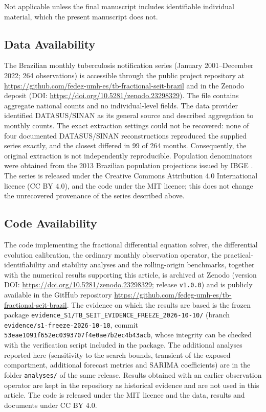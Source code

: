 \documentclass[pdflatex,sn-mathphys-ay,lineno]{sn-jnl}
\begin{document}
Not applicable unless the final manuscript includes identifiable individual material, which the present manuscript does not.

\subsection{Data Availability}

The Brazilian monthly tuberculosis notification series (January 2001--December 2022; 264 observations) is accessible through the public project repository at \url{https://github.com/fedeg-umh-es/tb-fractional-seit-brazil} and in the Zenodo deposit (DOI: \url{https://doi.org/10.5281/zenodo.23298329}). The file contains aggregate national counts and no individual-level fields. The data provider identified DATASUS/SINAN as its general source and described aggregation to monthly counts. The exact extraction settings could not be recovered: none of four documented DATASUS/SINAN reconstructions reproduced the supplied series exactly, and the closest differed in 99 of 264 months. Consequently, the original extraction is not independently reproducible. Population denominators were obtained from the 2013 Brazilian population projections issued by IBGE \citep{ibge2013}. The series is released under the Creative Commons Attribution 4.0 International licence (CC BY 4.0), and the code under the MIT licence; this does not change the unrecovered provenance of the series described above.

\subsection{Code Availability}

The code implementing the fractional differential equation solver, the differential evolution calibration, the ordinary monthly observation operator, the practical-identifiability and stability analyses and the rolling-origin benchmarks, together with the numerical results supporting this article, is archived at Zenodo (version DOI: \url{https://doi.org/10.5281/zenodo.23298329}; release \texttt{v1.0.0}) and is publicly available in the GitHub repository \url{https://github.com/fedeg-umh-es/tb-fractional-seit-brazil}. The evidence on which the results are based is the frozen package \nolinkurl{evidence_S1/TB_SEIT_EVIDENCE_FREEZE_2026-10-10/} (branch \nolinkurl{evidence/s1-freeze-2026-10-10}, commit \texttt{53eae1091f652ec03937\allowbreak 07f4e0ae7b2ec4b43acb}, whose integrity can be checked with the verification script included in the package. The additional analyses reported here (sensitivity to the search bounds, transient of the exposed compartment, additional forecast metrics and SARIMA coefficients) are in the folder \texttt{analyses/} of the same release. Results obtained with an earlier observation operator are kept in the repository as historical evidence and are not used in this article. The code is released under the MIT licence and the data, results and documents under CC BY 4.0.
\end{document}
